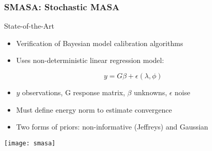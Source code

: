 \documentclass[mathserif]{beamer}
\begin{document}

\begin{frame}
  \frametitle{SMASA: Stochastic MASA}

  \begin{block}{State-of-the-Art}
    \begin{itemize} 
    \item Verification of Bayesian model calibration algorithms
    \item Uses non-deterministic linear regression model:
    \end{itemize}
    
    \begin{equation*}
        y = G \beta + \epsilon(\lambda,\phi)
    \end{equation*}
    
    \begin{itemize}
      \item $y$ observations, G response matrix, $\beta$ unknowns, $\epsilon$ noise 
      \item Must define energy norm to estimate convergence
      \item Two forms of priors: non-informative (Jeffreys) and Gaussian
    \end{itemize}
  \end{block}


    \centering
    \texttt{[image: smasa]}

\end{frame}
\end{document}
